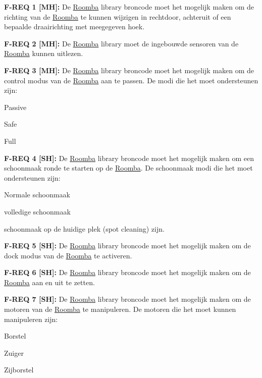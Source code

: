 {\bfseries{F-\/\+REQ 1 \mbox{[}MH\mbox{]}\+:}} De \mbox{\hyperlink{namespace_roomba}{Roomba}} library broncode moet het mogelijk maken om de richting van de \mbox{\hyperlink{namespace_roomba}{Roomba}} te kunnen wijzigen in rechtdoor, achteruit of een bepaalde draairichting met meegegeven hoek.

{\bfseries{F-\/\+REQ 2 \mbox{[}MH\mbox{]}\+:}} De \mbox{\hyperlink{namespace_roomba}{Roomba}} library moet de ingebouwde sensoren van de \mbox{\hyperlink{namespace_roomba}{Roomba}} kunnen uitlezen.

{\bfseries{F-\/\+REQ 3 \mbox{[}MH\mbox{]}\+:}} De \mbox{\hyperlink{namespace_roomba}{Roomba}} library broncode moet het mogelijk maken om de control modus van de \mbox{\hyperlink{namespace_roomba}{Roomba}} aan te passen. De modi die het moet ondersteunen zijn\+:
\begin{DoxyItemize}
\item Passive
\item Safe
\item Full
\end{DoxyItemize}

{\bfseries{F-\/\+REQ 4 \mbox{[}SH\mbox{]}\+:}} De \mbox{\hyperlink{namespace_roomba}{Roomba}} library broncode moet het mogelijk maken om een schoonmaak ronde te starten op de \mbox{\hyperlink{namespace_roomba}{Roomba}}. De schoonmaak modi die het moet ondersteunen zijn\+:
\begin{DoxyItemize}
\item Normale schoonmaak
\item volledige schoonmaak
\item schoonmaak op de huidige plek (spot cleaning) zijn.
\end{DoxyItemize}

{\bfseries{F-\/\+REQ 5 \mbox{[}SH\mbox{]}\+:}} De \mbox{\hyperlink{namespace_roomba}{Roomba}} library broncode moet het mogelijk maken om de dock modus van de \mbox{\hyperlink{namespace_roomba}{Roomba}} te activeren.

{\bfseries{F-\/\+REQ 6 \mbox{[}SH\mbox{]}\+:}} De \mbox{\hyperlink{namespace_roomba}{Roomba}} library broncode moet het mogelijk maken om de \mbox{\hyperlink{namespace_roomba}{Roomba}} aan en uit te zetten.

{\bfseries{F-\/\+REQ 7 \mbox{[}SH\mbox{]}\+:}} De \mbox{\hyperlink{namespace_roomba}{Roomba}} library broncode moet het mogelijk maken om de motoren van de \mbox{\hyperlink{namespace_roomba}{Roomba}} te manipuleren. De motoren die het moet kunnen manipuleren zijn\+:
\begin{DoxyItemize}
\item Borstel
\item Zuiger
\item Zijborstel
\end{DoxyItemize}

